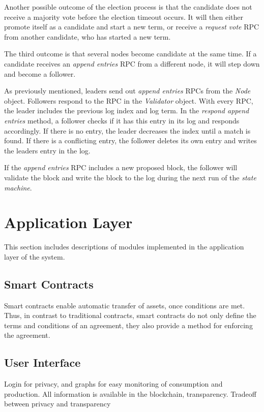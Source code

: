 Another possible outcome of the election process is that the candidate does not receive a majority vote before the election timeout occurs. It will then either promote itself as a candidate and start a new term, or receive a \textit{request vote} RPC from another candidate, who has started a new term.

The third outcome is that several nodes become candidate at the same time. If a candidate receives an \textit{append entries} RPC from a different node, it will step down and become a follower. 

As previously mentioned, leaders send out \textit{append entries} RPCs from the \textit{Node} object. Followers respond to the RPC in the \textit{Validator} object. With every RPC, the leader includes the previous log index and log term. In the \textit{respond append entries} method, a follower checks if it has this entry in its log and responds accordingly. If there is no entry, the leader decreases the index until a match is found. If there is a conflicting entry, the follower deletes its own entry and writes the leaders entry in the log. 

If the \textit{append entries} RPC includes a new proposed block, the follower will validate the block and write the block to the log during the next run of the \textit{state machine}. 

\section{Application Layer}
This section includes descriptions of modules implemented in the application layer of the system. 

\subsection{Smart Contracts}
Smart contracts enable automatic transfer of assets, once conditions are met. Thus, in contrast to traditional contracts, smart contracts do not only define the terms and conditions of an agreement, they also provide a method for enforcing the agreement.

\subsection{User Interface}
Login for privacy, and graphs for easy monitoring of consumption and production. All information is available in the blockchain, transparency. Tradeoff between privacy and transparency